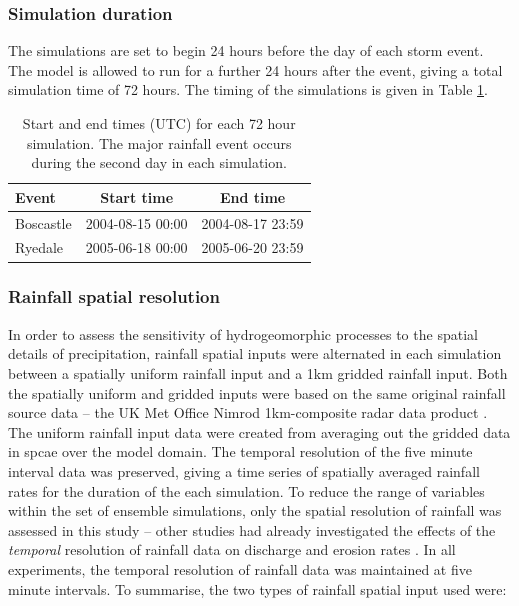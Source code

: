 \subsubsection{Simulation duration}

The simulations are set to begin 24 hours before the day of each storm event. The model is allowed to run for a further 24 hours after the event, giving a total simulation time of 72 hours. The timing of the simulations is given in Table \ref{table_start_time_hydrog_sims}.

\begin{table}[htbp]
\begin{tabular}{l c  c}
\textbf{Event}  &   \textbf{Start time} &  \textbf{End time} \\
\hline 
Boscastle          &  2004-08-15 00:00  &  2004-08-17 23:59 \\
Ryedale             &  2005-06-18 00:00  &  2005-06-20 23:59 \\
\hline

\end{tabular}
\caption{Start and end times (UTC) for each 72 hour simulation. The major rainfall event occurs during the second day in each simulation.}
\label{table_start_time_hydrog_sims}
\end{table}

\subsubsection{Rainfall spatial resolution}
In order to assess the sensitivity of hydrogeomorphic processes to the spatial details of precipitation, rainfall spatial inputs were alternated in each simulation between a spatially uniform rainfall input and a 1km gridded rainfall input. Both the spatially uniform and gridded inputs were based on the same original rainfall source data -- the UK Met Office Nimrod 1km-composite radar data product \citep{metoffice2003nimrod}. The uniform rainfall input data were created from averaging out the gridded data in spcae over the model domain. The temporal resolution of the five minute interval data was preserved, giving a time series of spatially averaged rainfall rates for the duration of the each simulation. To reduce the range of variables within the set of ensemble simulations, only the spatial resolution of rainfall was assessed in this study -- other studies had already investigated the effects of the \textit{temporal} resolution of rainfall data on discharge and erosion rates \citep{nicotina2008impact,Coulthard2013,coulthard2016sensitivity}. In all experiments, the temporal resolution of rainfall data was maintained at five minute intervals. To summarise, the two types of rainfall spatial input used were: 

